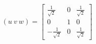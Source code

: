 \begin{enumerate}
    \[
    ( u \ v \ w ) =
    \begin{bmatrix} 
    \frac{1}{\sqrt{2}} & 0 & \frac{1}{\sqrt{2}} \\
    0 & 1 & 0 \\
    -\frac{1}{\sqrt{2}} & 0 & \frac{1}{\sqrt{2}}
    \end{bmatrix}
    \]
\end{enumerate}
